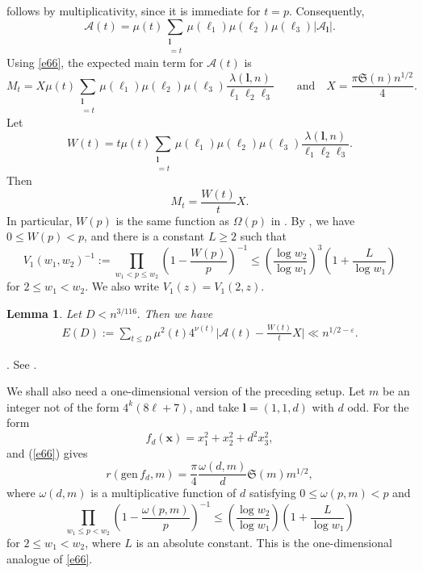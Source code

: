 \documentclass[10pt,a4paper]{amsart}
\numberwithin{equation}{section}
\newtheorem{lemma}{Lemma}
\begin{document}
follows by multiplicativity, since it is immediate for $t=p$. Consequently,
\begin{equation}\label{e:A_t}
\mathcal A(t)=
\mu(t)\sum_{\substack{\mathbf l\\ [\ell_1,\ell_2,\ell_3]=t}}
\mu(\ell_1)\mu(\ell_2)\mu(\ell_3)|\mathcal A_{\mathbf l}|.
\end{equation}
Using \eqref{e66}, the expected main term for $\mathcal A(t)$ is
\[
M_t=X\mu(t)\sum_{\substack{\mathbf l\\ [\ell_1,\ell_2,\ell_3]=t}}
\mu(\ell_1)\mu(\ell_2)\mu(\ell_3)
\frac{\lambda(\mathbf l,n)}{\ell_1\ell_2\ell_3}
\qquad \text{and} \quad
X=\frac{\pi\mathfrak S(n)n^{1/2}}4.
\]
Let
\begin{equation}\label{e46}
W(t)=t\mu(t)\sum_{\substack{\mathbf l\\ [\ell_1,\ell_2,\ell_3]=t}}
\mu(\ell_1)\mu(\ell_2)\mu(\ell_3)
\frac{\lambda(\mathbf l,n)}{\ell_1\ell_2\ell_3}.
\end{equation}
Then
\[
M_t=\frac{W(t)}tX.
\]
In particular, $W(p)$ is the same function as $\Omega(p)$ in \cite[(3.11)]{Lv}. By \cite[(3.13)]{Lv}, we have $0\leq W(p)<p$, and there is a constant $L\geq2$ such that
\begin{equation}\label{e:V1}
V_1(w_1,w_2)^{-1}:=
\prod_{w_1<p\leq w_2}\left(1-\frac{W(p)}p\right)^{-1}
\leq
\left(\frac{\log w_2}{\log w_1}\right)^3
\left(1+\frac L{\log w_1}\right)
\end{equation}
for $2\leq w_1<w_2$. We also write $V_1(z)=V_1(2,z)$.

\begin{lemma}\label{pro1}
Let $D< n^{3/116}.$ Then we have
\begin{align*}
E(D):=\sum_{t\leq D}\mu^{2}(t)4^{\nu(t)}\Big|\mathcal{A}(t)-\frac{W(t)}{t} X\Big|\ll n^{1/2 - \varepsilon}.
\end{align*}
\end{lemma}

. See \cite[Lemma 17]{Wa}.


We shall also need a one-dimensional version of the preceding setup. Let $m$ be an integer not of the form $4^k(8\ell+7)$, and take $\mathbf l=(1,1,d)$ with $d$ odd. For the form
\[
f_d(\mathbf x)=x_1^2+x_2^2+d^2x_3^2,
\]
and (\ref{e66}) gives
\begin{equation}\label{e67}
r(\mathrm{gen}\,f_d,m)=\frac{\pi}{4}\frac{\omega(d,m)}{d}\mathfrak S(m)m^{1/2},
\end{equation}
where $\omega(d,m)$ is a multiplicative function of $d$ satisfying $0\leq \omega(p,m)<p$ and
\begin{equation}\label{e71}
\prod_{w_1\leq p<w_2}\left(1-\frac{\omega(p,m)}p\right)^{-1}
\leq
\left(\frac{\log w_2}{\log w_1}\right)
\left(1+\frac L{\log w_1}\right)
\end{equation}
for $2\leq w_1<w_2$, where $L$ is an absolute constant. This is the one-dimensional analogue of \eqref{e66}.
\end{document}
